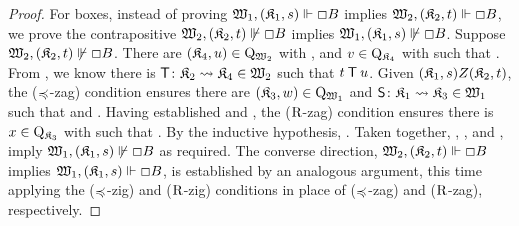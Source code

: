 \begin{proof}
    \medskip
    \noindent
    For boxes, instead of proving $\xforces {\wmodel_1} {\pair {\kmodel_1} s} {\Box B}$ implies $\xforces {\wmodel_2} {\pair {\kmodel_2} t} {\Box B}$, we prove the contrapositive $\nxforces {\wmodel_2} {\pair {\kmodel_2} t} {\Box B}$ implies $\nxforces {\wmodel_1} {\pair {\kmodel_1} s} {\Box B}$.
    Suppose $\nxforces {\wmodel_2} {\pair {\kmodel_2} t} {\Box B}$.
    There are
		${\pair {\kmodel_4} u} \in \Qwm[2]$
			with , and
		$v \in \Wkm[4]$
			with  
	such that
		.
	From , we know there is $\Tim\colon\kmodel_2 \fsim \kmodel_4 \in \wmodel_2$ such that $t \Tim u$.
	Given ${\pair {\kmodel_1} s} Z {\pair {\kmodel_2} t}$, the ($\Fsymb$-zag) condition ensures there are ${\pair {\kmodel_3} w} \in \Qwm[1]$ and $\Sim\colon\kmodel_1 \fsim \kmodel_3 \in \wmodel_1$ such that  and .
	Having established  and , the ($\R$-zag) condition ensures there is $x \in \Wkm[3]$ with  such that .
	By the inductive hypothesis, .
	Taken together, , , and , imply $\nxforces {\wmodel_1} {\pair {\kmodel_1} s} {\Box B}$ as required.
    The converse direction, $\xforces{\wmodel_2}{\pair{\kmodel_2}{t}}{\Box B}$ implies $\xforces{\wmodel_1}{\pair{\kmodel_1}{s}}{\Box B}$, is established by an analogous argument, this time applying the ($\Fsymb$-zig) and ($\R$-zig) conditions in place of ($\Fsymb$-zag) and ($\R$-zag), respectively.
\end{proof}



